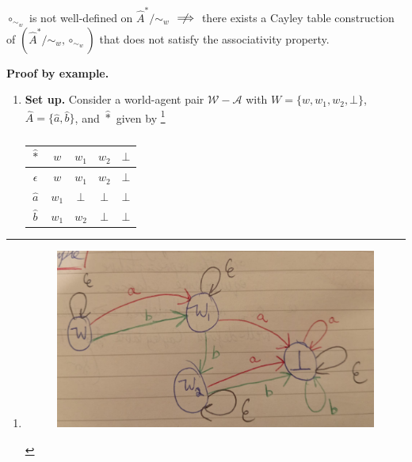 \begin{propositionE}\label{prp:circ_sim_w_not_well_defined_does_not_mean_no_associativity}
    $\circ_{\sim_{w}}$ is not well-defined on $\hat{A}^{*}/\sim_{w}$ $\centernot\implies$ there exists a Cayley table construction of $(\hat{A}^{*}/\sim_{w}, \circ_{\sim_{w}})$ that does not satisfy the associativity property.
\end{propositionE}
\begin{proofE}
\textbf{Proof by example.}
\begin{enumerate}[(1)]
    \item \textbf{Set up.}
    Consider a world-agent pair $\mathscr{W}-\mathscr{A}$ with $W = \{ w, w_{1}, w_{2}, \bot \}$, $\hat{A} = \{\hat{a}, \hat{b}\}$, and $\hat{\ast}$ given by
    \footnote{\begin{figure}[H]
        \includegraphics[width=0.5\linewidth]{6BeyondSBDRLLocalAlgebras/Images/circ_sim_w_not_well_defined_does_not_mean_no_associativity_counter_example.jpeg}
        \caption{
        }
    \end{figure}}
    \begin{table}[H]
        \centering
        \begin{tabular}{c|cccc}
            $\hat{\ast}$   & $w$       & $w_{1}$   & $w_{2}$   & $\bot$ \\
            \hline
            $\epsilon$      & $w$       & $w_{1}$   & $w_{2}$   & $\bot$ \\
            $\hat{a}$       & $w_{1}$   & $\bot$   & $\bot$   & $\bot$ \\
            $\hat{b}$       & $w_{1}$   & $w_{2}$   & $\bot$   & $\bot$
        \end{tabular}
        \caption{
        }
    \end{table}


\end{enumerate}
\end{proofE}
